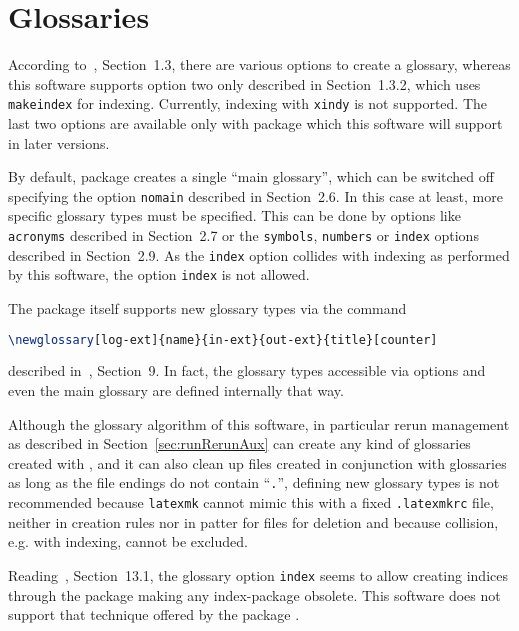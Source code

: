 \section{Glossaries}\label{sec:gapGlossaries}

According to~\cite{GloP4_54}, Section~1.3, 
there are various options to create a glossary, 
whereas this software supports option two only described in Section~1.3.2, 
which uses \texttt{makeindex} for indexing. 
Currently, indexing with \texttt{xindy} is not supported. 
The last two options are available only with package  
which this software will support in later versions. 

By default, package  creates a single ``main glossary'', 
which can be switched off specifying the option \texttt{nomain} 
described in Section~2.6. 
In this case at least, more specific glossary types must be specified. 
This can be done by options like \texttt{acronyms} described in Section~2.7 
or the \texttt{symbols},
\texttt{numbers} or \texttt{index} options described in Section~2.9. 
As the \texttt{index} option collides with indexing as performed by this software, 
the option \texttt{index} is not allowed. 

The package  itself 
supports new glossary types via the command
%
\begin{lstlisting}[language=TeX, basicstyle=\small]
\newglossary[log-ext]{name}{in-ext}{out-ext}{title}[counter]
\end{lstlisting}
%
described in~\cite{GloP4_54}, Section~9. 
In fact, the glossary types accessible via options and even the main glossary 
are defined internally that way. 

Although the glossary algorithm of this software, 
in particular rerun management as described in Section~\ref{sec:runRerunAux}
can create any kind of glossaries created with , 
and it can also clean up files created in conjunction with glossaries 
as long as the file endings do not contain ``\texttt{.}'',
defining new glossary types is not recommended 
because \texttt{latexmk} cannot mimic this 
with a fixed \texttt{.latexmkrc} file, neither in creation rules 
nor in patter for files for deletion  
and because collision, e.g. with indexing, cannot be excluded. 

Reading~\cite{GloP4_54}, Section~13.1, the glossary option \texttt{index} 
seems to allow creating indices through the  package 
making any index-package obsolete. 
This software does not support that technique offered by the package . 

